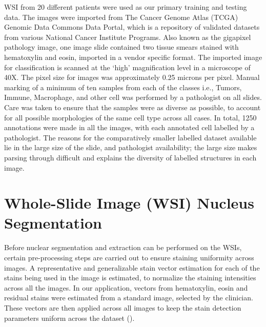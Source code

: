 \documentclass[
]{book}
\begin{document}
WSI from 20 different patients were used as our primary training and testing data. The images were imported from The Cancer Genome Atlas (TCGA) Genomic Data Commons Data Portal, which is a repository of validated datasets from various National Cancer Institute Programs. Also known as the gigapixel pathology image, one image slide contained two tissue smears stained with hematoxylin and eosin, imported in a vendor specific format. The imported image for classification is scanned at the `high' magnification level in a microscope of 40X. The pixel size for images was approximately 0.25 microns per pixel. Manual marking of a minimum of ten samples from each of the classes i.e., Tumors, Immune, Macrophage, and other cell was performed by a pathologist on all slides. Care was taken to ensure that the samples were as diverse as possible, to account for all possible morphologies of the same cell type across all cases. In total, 1250 annotations were made in all the images, with each annotated cell labelled by a pathologist. The reasons for the comparatively smaller labelled dataset available lie in the large size of the slide, and pathologist availability; the large size makes parsing through difficult and explains the diversity of labelled structures in each image.

\hypertarget{whole-slide-image-wsi-nucleus-segmentation}{%
\section{Whole-Slide Image (WSI) Nucleus Segmentation}\label{whole-slide-image-wsi-nucleus-segmentation}}

Before nuclear segmentation and extraction can be performed on the WSIs, certain pre-processing steps are carried out to ensure staining uniformity across images. A representative and generalizable stain vector estimation for each of the stains being used in the image is estimated, to normalize the staining intensities across all the images. In our application, vectors from hematoxylin, eosin and residual stains were estimated from a standard image, selected by the clinician. These vectors are then applied across all images to keep the stain detection parameters uniform across the dataset (\citet{Bankhead18}).
\end{document}
